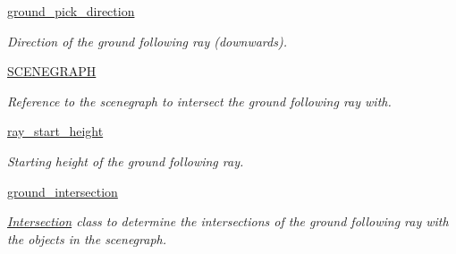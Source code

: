 \begin{DoxyCompactItemize}
\hyperlink{classlib_1_1GroundFollowing_1_1GroundFollowing_a8ddb73a0e3f3b97ea191866edc79b4f2}{ground\-\_\-pick\-\_\-direction}
\begin{DoxyCompactList}\small\item\em \-Direction of the ground following ray (downwards). \end{DoxyCompactList}\item 
\hyperlink{classlib_1_1GroundFollowing_1_1GroundFollowing_ae7fce065061a116be68532308fb5a1de}{\-S\-C\-E\-N\-E\-G\-R\-A\-P\-H}
\begin{DoxyCompactList}\small\item\em \-Reference to the scenegraph to intersect the ground following ray with. \end{DoxyCompactList}\item 
\hyperlink{classlib_1_1GroundFollowing_1_1GroundFollowing_ab9cec0c413ea4adb281fd333147f8cac}{ray\-\_\-start\-\_\-height}
\begin{DoxyCompactList}\small\item\em \-Starting height of the ground following ray. \end{DoxyCompactList}\item 
\hyperlink{classlib_1_1GroundFollowing_1_1GroundFollowing_a03a9851898521686e124901b5efef042}{ground\-\_\-intersection}
\begin{DoxyCompactList}\small\item\em \hyperlink{namespacelib_1_1Intersection}{\-Intersection} class to determine the intersections of the ground following ray with the objects in the scenegraph. \end{DoxyCompactList}\end{DoxyCompactItemize}
